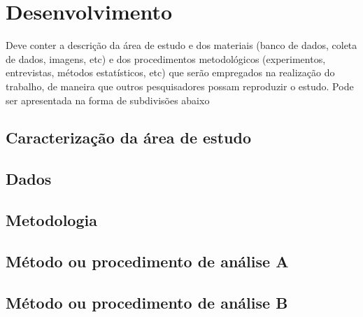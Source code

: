 \chapter{Desenvolvimento}

Deve conter a descrição da área de estudo e dos materiais (banco de dados, coleta de dados, imagens, etc) e dos procedimentos metodológicos (experimentos, entrevistas, métodos estatísticos, etc) que serão empregados na realização do trabalho, de maneira que outros pesquisadores possam reproduzir o estudo. Pode ser apresentada na forma de subdivisões abaixo

\section{Caracterização da área de estudo}

\section{Dados}

\section{Metodologia}

\section{Método ou procedimento de análise A}

\section{Método ou procedimento de análise B}